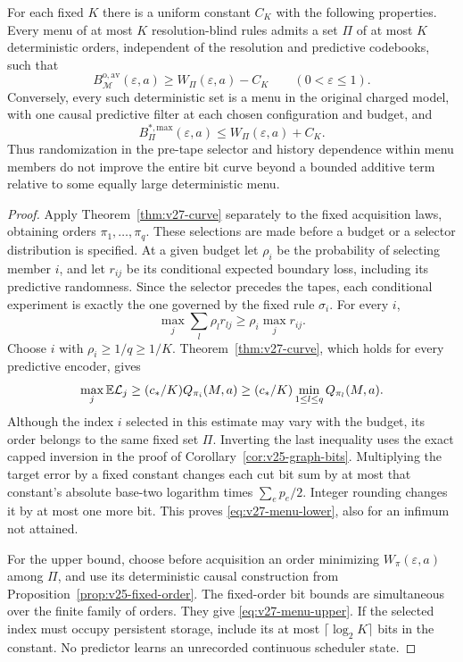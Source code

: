 \begin{theorem}
\label{thm:v27-menu}
For each fixed $K$ there is a uniform constant $C_K$ with the following properties. Every menu of at most $K$ resolution-blind rules admits a set $\Pi$ of at most $K$ deterministic orders, independent of the resolution and predictive codebooks, such that
\begin{equation}\label{eq:v27-menu-lower}
       B^{\mathrm{o,av}}_{\mathcal M}(\varepsilon,a)
                   \ge W_\Pi(\varepsilon,a)-C_K
                       \qquad(0<\varepsilon\le1).
\end{equation}
Conversely, every such deterministic set is a menu in the original charged model, with one causal predictive filter at each chosen configuration and budget, and
\begin{equation}\label{eq:v27-menu-upper}
       B^{*,\mathrm{max}}_\Pi(\varepsilon,a)
                   \le W_\Pi(\varepsilon,a)+C_K.
\end{equation}
Thus randomization in the pre-tape selector and history dependence within menu members do not improve the entire bit curve beyond a bounded additive term relative to some equally large deterministic menu.
\end{theorem}
\begin{proof}
Apply Theorem~\ref{thm:v27-curve} separately to the fixed acquisition laws, obtaining orders $\pi_1,\ldots,\pi_q$. These selections are made before a budget or a selector distribution is specified. At a given budget let $\rho_i$ be the probability of selecting member $i$, and let $r_{ij}$ be its conditional expected boundary loss, including its predictive randomness. Since the selector precedes the tapes, each conditional experiment is exactly the one governed by the fixed rule $\sigma_i$. For every $i$,
\[
       \max_j\sum_l\rho_l r_{lj}\ge\rho_i\max_jr_{ij}.
\]
Choose $i$ with $\rho_i\ge1/q\ge1/K$. Theorem~\ref{thm:v27-curve}, which holds for every predictive encoder, gives
\[
       \max_j\mathbb E\mathcal L_j
          \ge(c_*/K)Q_{\pi_i}(M,a)
          \ge(c_*/K)\min_{1\le l\le q}Q_{\pi_l}(M,a).
\]
Although the index $i$ selected in this estimate may vary with the budget, its order belongs to the same fixed set $\Pi$. Inverting the last inequality uses the exact capped inversion in the proof of Corollary~\ref{cor:v25-graph-bits}. Multiplying the target error by a fixed constant changes each cut bit sum by at most that constant's absolute base-two logarithm times $\sum_ep_e/2$. Integer rounding changes it by at most one more bit. This proves \eqref{eq:v27-menu-lower}, also for an infimum not attained.

For the upper bound, choose before acquisition an order minimizing $W_\pi(\varepsilon,a)$ among $\Pi$, and use its deterministic causal construction from Proposition~\ref{prop:v25-fixed-order}. The fixed-order bit bounds are simultaneous over the finite family of orders. They give \eqref{eq:v27-menu-upper}. If the selected index must occupy persistent storage, include its at most $\lceil\log_2K\rceil$ bits in the constant. No predictor learns an unrecorded continuous scheduler state.
\end{proof}

